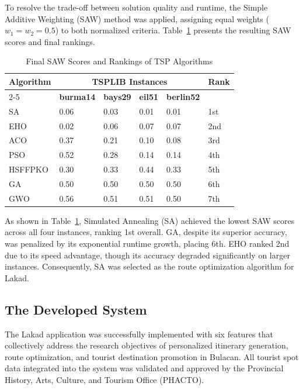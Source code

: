  
To resolve the trade-off between solution quality and runtime, the Simple
Additive Weighting (SAW) method was applied, assigning equal weights
($w_1 = w_2 = 0.5$) to both normalized criteria. Table~\ref{tab:rank}
presents the resulting SAW scores and final rankings.
 
\begin{table}[H]
    \centering
    \singlespacing
    \caption{Final SAW Scores and Rankings of TSP Algorithms}
    \label{tab:rank}
    \renewcommand{\arraystretch}{1.2}
    \begin{tabularx}{\linewidth}{XXXXXX}
        \toprule
        \multirow{2}{*}{\textbf{Algorithm}} &
        \multicolumn{4}{c}{\textbf{TSPLIB Instances}} &
        \multirow{2}{*}{\textbf{Rank}} \\
        \cmidrule(lr){2-5}
         & \textbf{burma14} & \textbf{bays29} & \textbf{eil51} &
           \textbf{berlin52} & \\
        \midrule
        SA      & 0.06 & 0.03 & 0.01 & 0.01 & 1st \\
        EHO     & 0.02 & 0.06 & 0.07 & 0.07 & 2nd \\
        ACO     & 0.37 & 0.21 & 0.10 & 0.08 & 3rd \\
        PSO     & 0.52 & 0.28 & 0.14 & 0.14 & 4th \\
        HSFFPKO & 0.30 & 0.33 & 0.44 & 0.33 & 5th \\
        GA      & 0.50 & 0.50 & 0.50 & 0.50 & 6th \\
        GWO     & 0.56 & 0.51 & 0.51 & 0.50 & 7th \\
        \bottomrule
    \end{tabularx}
\end{table}
 
As shown in Table~\ref{tab:rank}, Simulated Annealing (SA) achieved the
lowest SAW scores across all four instances, ranking 1st overall.
GA, despite its superior accuracy, was penalized by its exponential
runtime growth, placing 6th. EHO ranked 2nd due to its speed advantage,
though its accuracy degraded significantly on larger instances.
Consequently, SA was selected as the route optimization algorithm
for Lakad.

\subsection{The Developed System}

The Lakad application was successfully implemented with six features
that collectively address the research objectives of personalized
itinerary generation, route optimization, and tourist destination
promotion in Bulacan. All tourist spot data integrated into the system
was validated and approved by the Provincial History, Arts, Culture,
and Tourism Office (PHACTO).

